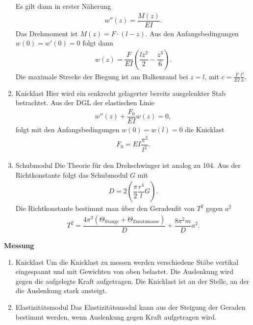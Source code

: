 \begin{enumerate}[label=--]
                Es gilt dann in erster Näherung
                \begin{align} 
                        w''\left(z\right)=\dfrac{M\left(z\right)}{EI}
                .\end{align} 
                Das Drehmoment ist $M\left(z\right)=F\cdot \left(l-z\right)$. 
                Aus den Anfangsbedingungen $w\left(0\right)=w'\left(0\right)=0$ folgt dann
                \begin{align} 
                        w\left(z\right)=\dfrac{F}{EI}\left(\dfrac{lz^2}{2}-\dfrac{z^3}{6}\right)
                .\end{align} 
                Die maximale Strecke der Biegung ist am Balkenrand bei $z=l$, mit $c=\tfrac{F}{EI}\tfrac{l^3}{3}$.
        \item Knicklast \hspace{25pt} 
                Hier wird ein senkrecht gelagerter bereits ausgelenkter Stab betrachtet.
                Aus der DGL der elastischen Linie
                \begin{align} 
                        w''\left(z\right)+\dfrac{F_0}{EI}w\left(z\right)=0
                ,\end{align} 
                folgt mit den Anfangsbedingungen $w\left(0\right)=w\left(l\right)=0$ die Knicklast
                \begin{align} 
                        F_0=EI\dfrac{\pi ^2}{l^2}
                .\end{align} 
        \item Schubmodul \hspace{25pt} 
                Die Theorie für den Drehschwinger ist analog zu 104.
                Aus der Richtkonstante folgt das Schubmodul $G$ mit
                \begin{align} 
                        D=2\left(\dfrac{\pi }{2}\dfrac{r^4}{l}G\right)
                .\end{align} 
                Die Richtkonstante bestimmt man über den Geradenfit von $T^2$ gegen $a^2$ 
                \begin{align} 
                        T^2=\dfrac{4\pi ^2\left(\Theta _{\text{Stange}}+\Theta _{\text{Zusatzmasse}}\right)}{D}+\dfrac{8\pi ^2m}{D}a^2
                .\end{align} 
\end{enumerate}
\textbf{Messung}
\begin{enumerate}[label=--]
        \item Knicklast \hspace{25pt} 
                Um die Knicklast zu messen werden verschiedene Stäbe vertikal eingespannt und mit Gewichten von oben belastet.
                Die Auslenkung wird gegen die aufgelegte Kraft aufgetragen. 
                Die Knicklast ist an der Stelle, an der die Auslenkung stark ansteigt.
        \item Elastizitätsmodul \hspace{25pt} 
                Das Elastizitätsmodul kann aus der Steigung der Geraden bestimmt werden, wenn Auslenkung gegen Kraft aufgetragen wird.
\end{enumerate}


